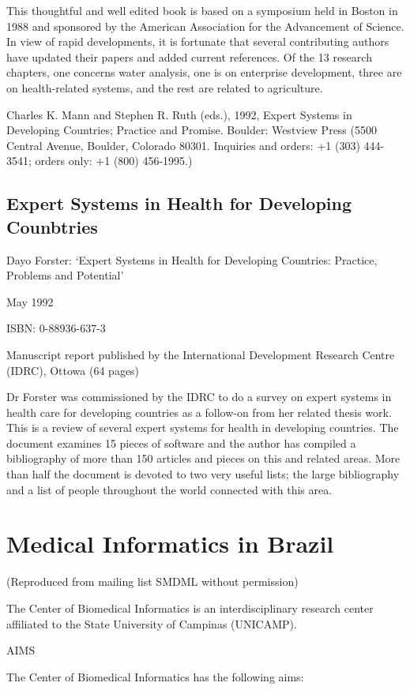 This thoughtful and well edited book is based on a symposium held in
Boston in 1988 and sponsored by the American Association for the
Advancement of Science. In view of rapid developments, it is fortunate
that several contributing authors have updated their papers and added
current references. Of the 13 research chapters, one concerns water
analysis, one is on enterprise development, three are on health-related
systems, and the rest are related to agriculture.

Charles K. Mann and Stephen R. Ruth (eds.), 1992, Expert Systems in
Developing Countries; Practice and Promise. Boulder: Westview Press
(5500 Central Avenue, Boulder, Colorado 80301. Inquiries and orders: +1
(303) 444-3541; orders only: +1 (800) 456-1995.)

\subsection{Expert Systems in Health for Developing Counbtries}

Dayo Forster: `Expert Systems in Health for Developing Countries:
Practice, Problems and Potential'

May 1992

ISBN: 0-88936-637-3

Manuscript report published by the International Development Research
Centre (IDRC), Ottowa (64 pages)

Dr Forster was commissioned by the IDRC to do a survey on expert
systems in health care for developing countries as a follow-on from her
related thesis work. This is a review of several expert systems for
health in developing countries. The document examines 15 pieces of
software and the author has compiled a bibliography of more than 150 articles
and pieces on this and related areas. More than half the document is
devoted to two very useful lists; the large bibliography and a list of
people throughout the world connected with this area.

\section{Medical Informatics in Brazil}
(Reproduced from  mailing list SMDML without permission)
 
The Center of Biomedical Informatics is an
interdisciplinary research center affiliated to the State
University of Campinas (UNICAMP).
 
AIMS
 
The Center of Biomedical Informatics has the following aims:
 
